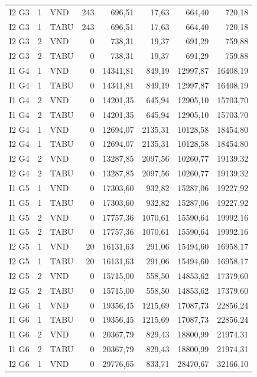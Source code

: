 \begin{longtable}{lrlrrrrr}
I2 G3 & 1 & VND & 243 & 696,51 & 17,63 & 664,40 & 720,18 \\
I2 G3 & 1 & TABU & 243 & 696,51 & 17,63 & 664,40 & 720,18 \\
I2 G3 & 2 & VND & 0 & 738,31 & 19,37 & 691,29 & 759,88 \\
I2 G3 & 2 & TABU & 0 & 738,31 & 19,37 & 691,29 & 759,88 \\
I1 G4 & 1 & VND & 0 & 14341,81 & 849,19 & 12997,87 & 16408,19 \\
I1 G4 & 1 & TABU & 0 & 14341,81 & 849,19 & 12997,87 & 16408,19 \\
I1 G4 & 2 & VND & 0 & 14201,35 & 645,94 & 12905,10 & 15703,70 \\
I1 G4 & 2 & TABU & 0 & 14201,35 & 645,94 & 12905,10 & 15703,70 \\
I2 G4 & 1 & VND & 0 & 12694,07 & 2135,31 & 10128,58 & 18454,80 \\
I2 G4 & 1 & TABU & 0 & 12694,07 & 2135,31 & 10128,58 & 18454,80 \\
I2 G4 & 2 & VND & 0 & 13287,85 & 2097,56 & 10260,77 & 19139,32 \\
I2 G4 & 2 & TABU & 0 & 13287,85 & 2097,56 & 10260,77 & 19139,32 \\
I1 G5 & 1 & VND & 0 & 17303,60 & 932,82 & 15287,06 & 19227,92 \\
I1 G5 & 1 & TABU & 0 & 17303,60 & 932,82 & 15287,06 & 19227,92 \\
I1 G5 & 2 & VND & 0 & 17757,36 & 1070,61 & 15590,64 & 19992,16 \\
I1 G5 & 2 & TABU & 0 & 17757,36 & 1070,61 & 15590,64 & 19992,16 \\
I2 G5 & 1 & VND & 20 & 16131,63 & 291,06 & 15494,60 & 16958,17 \\
I2 G5 & 1 & TABU & 20 & 16131,63 & 291,06 & 15494,60 & 16958,17 \\
I2 G5 & 2 & VND & 0 & 15715,00 & 558,50 & 14853,62 & 17379,60 \\
I2 G5 & 2 & TABU & 0 & 15715,00 & 558,50 & 14853,62 & 17379,60 \\
I1 G6 & 1 & VND & 0 & 19356,45 & 1215,69 & 17087,73 & 22856,24 \\
I1 G6 & 1 & TABU & 0 & 19356,45 & 1215,69 & 17087,73 & 22856,24 \\
I1 G6 & 2 & VND & 0 & 20367,79 & 829,43 & 18800,99 & 21974,31 \\
I1 G6 & 2 & TABU & 0 & 20367,79 & 829,43 & 18800,99 & 21974,31 \\
I2 G6 & 1 & VND & 0 & 29776,65 & 833,71 & 28470,67 & 32166,10 \\

\end{longtable}
